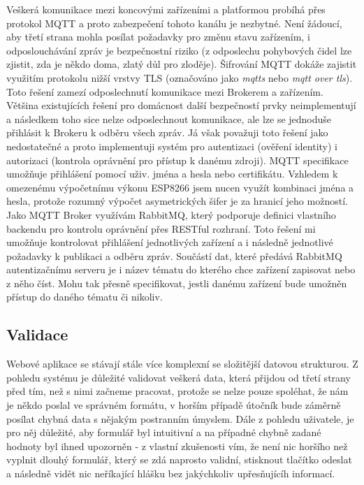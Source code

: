 Veškerá komunikace mezi koncovými zařízeními a platformou probíhá přes protokol MQTT a proto zabezpečení tohoto kanálu je nezbytné. Není žádoucí, aby třetí strana mohla posílat požadavky pro změnu stavu zařízením, i odposlouchávání zpráv je bezpečnostní riziko (z odposlechu pohybových čidel lze zjistit, zda je někdo doma, zlatý důl pro zloděje). Šifrování MQTT dokáže zajistit využitím protokolu nižší vrstvy TLS (označováno jako \textit{mqtts} nebo \textit{mqtt over tls}). Toto řešení zamezí odposlechnutí komunikace mezi Brokerem a zařízením. Většina existujících řešení pro domácnost další bezpečností prvky neimplementují a následkem toho sice nelze odposlechnout komunikace, ale lze se jednoduše přihlásit k Brokeru k odběru všech zpráv. Já však považuji toto řešení jako nedostatečné a proto implementuji systém pro autentizaci (ověření identity) i autorizaci (kontrola oprávnění pro přístup k danému zdroji). MQTT specifikace umožňuje přihlášení pomocí uživ. jména a hesla nebo certifikátu. Vzhledem k omezenému výpočetnímu výkonu ESP8266 jsem nucen využít kombinaci jména a hesla, protože rozumný výpočet asymetrických šifer je za hranicí jeho možností. Jako MQTT Broker využívám RabbitMQ, který podporuje definici vlastního backendu pro kontrolu oprávnění přes RESTful rozhraní. Toto řešení mi umožňuje kontrolovat přihlášení jednotlivých zařízení a i následně jednotlivé požadavky k publikaci a odběru zpráv. Součástí dat, které předává RabbitMQ autentizačnímu serveru je i název tématu do kterého chce zařízení zapisovat nebo z něho číst. Mohu tak přesně specifikovat, jestli danému zařízení bude umožněn přístup do daného tématu či nikoliv.

\subsection{Validace}
\label{BE:Validace}
Webové aplikace se stávají stále více komplexní se složitější datovou strukturou. Z pohledu systému je důležité validovat veškerá data, která přijdou od třetí strany před tím, než s nimi začneme pracovat, protože se nelze pouze spoléhat, že nám je někdo poslal ve správném formátu, v horším případě útočník bude záměrně posílat chybná data s nějakým postranním úmyslem. Dále z pohledu uživatele, je pro něj důležité, aby formulář byl intuitivní a na případné chybně zadané hodnoty byl ihned upozorněn - z vlastní zkušenosti vím, že není nic horšího než vyplnit dlouhý formulář, který se zdá naprosto validní, stisknout tlačítko odeslat a následně vidět nic neříkající hlášku  bez jakýchkoliv upřesňujícíh informací.

